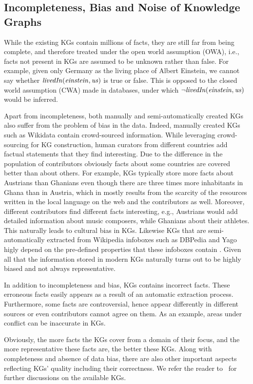 \subsection{Incompleteness, Bias and Noise of Knowledge Graphs}
\label{sec:kg_realm}
While the existing KGs contain millions of facts, they are still far from being complete, and therefore treated under the open world assumption (OWA), i.e., facts not present in KGs are assumed to be unknown rather than false. For example, given only Germany as the living place of Albert Einstein,  we cannot say whether $\mathit{livedIn(einstein,us)}$ is true or false. This is opposed to the closed world assumption (CWA) made in databases, under which $\mathit{\neg livedIn(einstein,us)}$ would be inferred. %

Apart from incompleteness, both manually and semi-automatically created KGs also suffer from the problem of bias in the data. Indeed,  manually created KGs such as Wikidata contain crowd-sourced information. While leveraging crowd-sourcing for KG construction, human curators from different countries add factual statements that they find interesting. Due to the difference in the population of contributors obviously facts about some countries are covered better than about others. For example, KGs typically store more facts about Austrians than Ghanians even though there are three times more inhabitants in Ghana than in Austria, which in mostly results from the scarcity of the resources written in the local language on the web and the contributors as well. Moreover, different contributors find different facts interesting, e.g., Austrians would add detailed information about music composers, while Ghanians about their athletes.  This naturally leads to cultural bias in KGs. Likewise KGs that are semi-automatically extracted from Wikipedia infoboxes such as DBPedia and Yago higly depend on the pre-defined properties that these infoboxes contain \cite{DBLP:conf/www/LajusS18}. Given all that the information stored in modern KGs naturally turns out to be highly biased and not always representative. 

In addition to incompleteness and bias, KGs contains incorrect facts. These erroneous facts easily appears as a result of an automatic extraction process. Furthermore, some facts are controversial, hence appear differently in different sources or even contributors cannot agree on them. As an example, areas under conflict can be inaccurate in KGs.

Obviously, the more facts the KGs cover from a %
domain  of their focus, and the more representative these facts are, %
the better these KGs. Along with completeness and absence of data bias, there are also other important aspects reflecting KGs' quality %
including %
their correctness.  We refer the reader to~\cite{Nickel2015ARO,DBLP:journals/semweb/Paulheim17} for further discussions on the available KGs.



